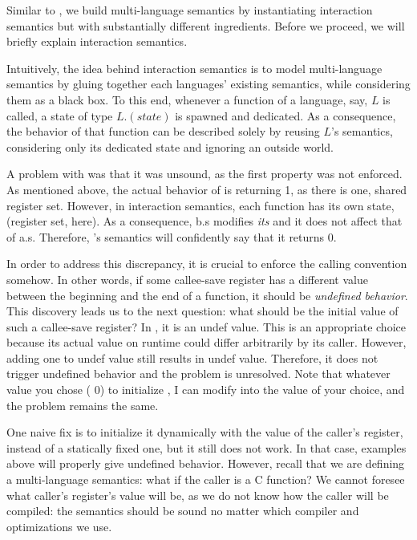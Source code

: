 {%

Similar to \ccc{}, we build multi-language semantics by instantiating interaction semantics but with substantially different ingredients.
Before we proceed, we will briefly explain interaction semantics.

Intuitively, the idea behind interaction semantics is to model multi-language semantics by gluing together each languages’ existing semantics, while considering them as a black box.
To this end, whenever a function of a language, say, $L$ is called, a state of type $L.(state)$ is spawned and dedicated.
As a consequence, the behavior of that function can be described solely by reusing $L$'s semantics, considering only its dedicated state and ignoring an outside world.

A problem with \ccc{} was that it was unsound, as the first property was not enforced.
As mentioned above, the actual behavior of  is returning 1, as there is one, shared register set.
However, in interaction semantics, each function has its own state, (register set, here).
As a consequence, b.s modifies \textit{its}  and it does not affect that of a.s.
Therefore, \ccc{}'s semantics will confidently say that it returns 0.

In order to address this discrepancy, it is crucial to enforce the calling convention somehow.
In other words, if some callee-save register has a different value between the beginning and the end of a function, it should be \textit{undefined behavior}.
This discovery leads us to the next question: what should be the initial value of such a callee-save register?
In \ccc{}, it is an undef value.
This is an appropriate choice because its actual value on runtime could differ arbitrarily by its caller.
However, adding one to undef value still results in undef value.
Therefore, it does not trigger undefined behavior and the problem is unresolved.
Note that whatever value you chose (\eg{} 0) to initialize , I can modify  into the value of your choice, and the problem remains the same.

One naive fix is to initialize it dynamically with the value of the caller's register, instead of a statically fixed one, but it still does not work.
In that case, examples above will properly give undefined behavior.
However, recall that we are defining a multi-language semantics: what if the caller is a C function?
We cannot foresee what caller's register's value will be, as we do not know how the caller will be compiled: the semantics should be sound no matter which compiler and optimizations we use.

}

